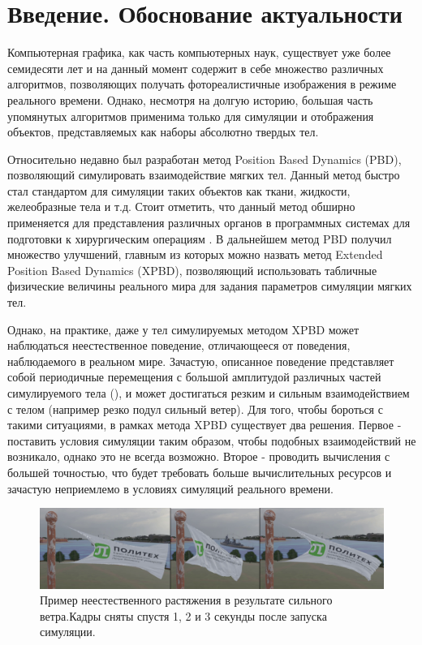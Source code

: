 \chapter*{Введение. Обоснование актуальности} %

Компьютерная графика, как часть компьютерных наук, существует уже более семидесяти лет и на данный момент содержит в себе множество различных алгоритмов, позволяющих получать фотореалистичные изображения в режиме реального времени. Однако, несмотря на долгую историю, большая часть упомянутых алгоритмов применима только для симуляции и отображения объектов, представляемых как наборы абсолютно твердых тел. 

Относительно недавно был разработан метод Position Based Dynamics (PBD)\cite{pbd}, позволяющий симулировать взаимодействие мягких тел. Данный метод быстро стал стандартом для симуляции таких объектов как ткани, жидкости, желеобразные тела и т.д. Стоит отметить, что данный метод обширно применяется для представления различных органов в программных системах для подготовки к хирургическим операциям \cite{li2022position}. В дальнейшем метод PBD получил множество улучшений, главным из которых можно назвать метод Extended Position Based Dynamics (XPBD)\cite{xpbd}, позволяющий использовать табличные физические величины реального мира для задания параметров симуляции мягких тел.

Однако, на практике, даже у тел симулируемых методом XPBD может наблюдаться неестественное поведение, отличающееся от поведения, наблюдаемого в реальном мире. Зачастую, описанное поведение представляет собой периодичные перемещения с большой амплитудой различных частей симулируемого тела (), и может достигаться резким и сильным взаимодействием с телом (например резко подул сильный ветер). Для того, чтобы бороться с такими ситуациями, в рамках метода XPBD существует два решения. Первое - поставить условия симуляции таким образом, чтобы подобных взаимодействий не возникало, однако это не всегда возможно. Второе - 
проводить вычисления с большей точностью, что будет требовать больше вычислительных ресурсов и зачастую неприемлемо в условиях симуляций реального времени. 

\begin{figure}[ht!] 
	\center
	\includegraphics [scale=0.2] {my_folder/images//streching}
	\caption{Пример неестественного растяжения в результате сильного ветра.\newline Кадры сняты спустя 1, 2 и 3 секунды после запуска симуляции.}
	\label{fig:streching}  
\end{figure}

